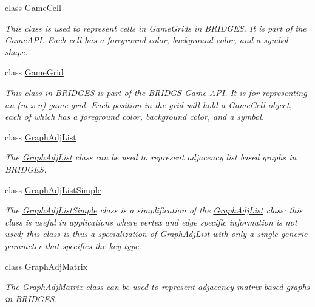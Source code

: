 \begin{DoxyCompactItemize}
class \hyperlink{classbridges_1_1base_1_1_game_cell}{Game\+Cell}
\begin{DoxyCompactList}\small\item\em This class is used to represent cells in Game\+Grids in B\+R\+I\+D\+G\+ES. It is part of the Game\+A\+PI. Each cell has a foreground color, background color, and a symbol shape. \end{DoxyCompactList}\item 
class \hyperlink{classbridges_1_1base_1_1_game_grid}{Game\+Grid}
\begin{DoxyCompactList}\small\item\em This class in B\+R\+I\+D\+G\+ES is part of the B\+R\+I\+D\+GS Game A\+PI. It is for representing an (m x n) game grid. Each position in the grid will hold a \hyperlink{classbridges_1_1base_1_1_game_cell}{Game\+Cell} object, each of which has a foreground color, background color, and a symbol. \end{DoxyCompactList}\item 
class \hyperlink{classbridges_1_1base_1_1_graph_adj_list}{Graph\+Adj\+List}
\begin{DoxyCompactList}\small\item\em The \hyperlink{classbridges_1_1base_1_1_graph_adj_list}{Graph\+Adj\+List} class can be used to represent adjacency list based graphs in B\+R\+I\+D\+G\+ES. \end{DoxyCompactList}\item 
class \hyperlink{classbridges_1_1base_1_1_graph_adj_list_simple}{Graph\+Adj\+List\+Simple}
\begin{DoxyCompactList}\small\item\em The \hyperlink{classbridges_1_1base_1_1_graph_adj_list_simple}{Graph\+Adj\+List\+Simple} class is a simplification of the \hyperlink{classbridges_1_1base_1_1_graph_adj_list}{Graph\+Adj\+List} class; this class is useful in applications where vertex and edge specific information is not used; this class is thus a specialization of \hyperlink{classbridges_1_1base_1_1_graph_adj_list}{Graph\+Adj\+List} with only a single generic parameter that specifies the key type. \end{DoxyCompactList}\item 
class \hyperlink{classbridges_1_1base_1_1_graph_adj_matrix}{Graph\+Adj\+Matrix}
\begin{DoxyCompactList}\small\item\em The \hyperlink{classbridges_1_1base_1_1_graph_adj_matrix}{Graph\+Adj\+Matrix} class can be used to represent adjacency matrix based graphs in B\+R\+I\+D\+G\+ES. \end{DoxyCompactList}\item 

\end{DoxyCompactItemize}
